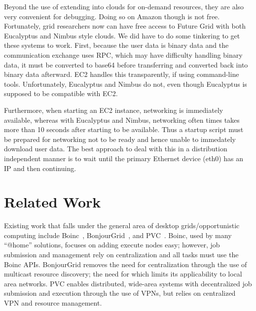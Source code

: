 \documentclass[conference]{IEEEtran}
\begin{document}
Beyond the use of extending into clouds for on-demand resources, they are also
very convenient for debugging.  Doing so on Amazon though is not free.
Fortunately, grid researchers now can have free access to Future Grid with both
Eucalyptus and Nimbus style clouds.  We did have to do some tinkering to get
these systems to work.  First, because the user data is binary data and the
communication exchange uses RPC, which may have difficulty handling binary
data, it must be converted to base64 before transferring and converted back
into binary data afterward.  EC2 handles this transparently, if using
command-line tools.  Unfortunately, Eucalyptus and Nimbus do not, even though
Eucalyptus is supposed to be compatible with EC2.

Furthermore, when starting an EC2 instance, networking is immediately
available, whereas with Eucalyptus and Nimbus, networking often times takes
more than 10 seconds after starting to be available. Thus a startup script must
be prepared for networking not to be ready and hence unable to immedately
download user data.  The best approach to deal with this in a distribution
independent manner is to wait until the primary Ethernet device (eth0) has an
IP and then continuing.

\section{Related Work}
\label{related_work}

Existing work that falls under the general area of desktop grids/opportunistic
computing include Boinc~\cite{boinc}, BonjourGrid~\cite{bonjourgrid}, and
PVC~\cite{pvc}.  Boinc, used by many ``@home'' solutions, focuses on adding
execute nodes easy; however, job submission and management rely on
centralization and all tasks must use the Boinc APIs.  BonjourGrid removes the
need for centralization through the use of multicast resource discovery; the
need for which limits its applicability to local area networks.  PVC enables
distributed, wide-area systems with decentralized job submission and execution
through the use of VPNs, but relies on centralized VPN and resource management.
\end{document}
